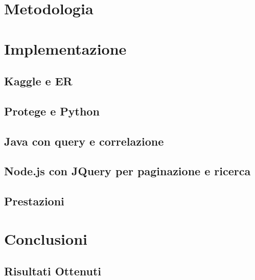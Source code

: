 \documentclass[Lau,binding=0.6cm,noexaminfo]{sapthesis}
\begin{document}
\chapter{Metodologia}

\chapter{Implementazione}
\section{Kaggle e ER}
\section{Protege e Python}
\section{Java con query e correlazione}
\section{Node.js con JQuery per paginazione e ricerca}
\section{Prestazioni}

\chapter{Conclusioni}
\section{Risultati Ottenuti}
\end{document}

